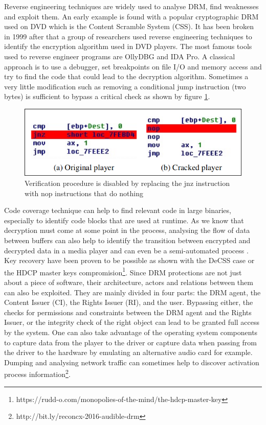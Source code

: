 \documentclass[11pt, twocolumn]{article}
\begin{document}
Reverse engineering techniques are widely used to analyse DRM, find weaknesses and exploit them.
An early example is found with a popular cryptographic DRM used on DVD which is the Content Scramble System (CSS).
It has been broken in 1999 after that a group of researchers used reverse engineering techniques to identify the encryption algorithm used in DVD players.
The most famous tools used to reverse engineer programs are OllyDBG and IDA Pro.
A classical approach is to use a debugger, set breakpoints on file I/O and memory access and try to find the code that could lead to the decryption algorithm.
Sometimes a very little modification \cite{Choi:2016} such as removing a conditional jump instruction (two bytes) is sufficient to bypass a critical check as shown by figure \ref{fig:bypass}.
\begin{figure}[ht]
	\centering
	\includegraphics[scale=0.4]{images/asmBypass.png}
	\caption{Verification procedure is disabled by replacing the jnz instruction with nop instructions that do nothing \cite{Choi:2016}}
	\label{fig:bypass}
\end{figure}
Code coverage technique can help to find relevant code in large binaries, especially to identify code blocks that are used at runtime.
As we know that decryption must come at some point in the process, analysing the flow of data between buffers can also help to identify the transition between encrypted and decrypted data in a media player and can even be a semi-automated process \cite{Wang:2013}.
Key recovery have been proven to be possible as shown with the DeCSS case or the HDCP master keys compromision\footnote{https://rudd-o.com/monopolies-of-the-mind/the-hdcp-master-key}.
Since DRM protections are not just about a piece of software, their architecture, actors and relations between them can also be exploited.
They are mainly divided in four parts: the DRM agent, the Content Issuer (CI), the Rights Issuer (RI), and the user.
Bypassing either, the checks for permissions and constraints between the DRM agent and the Rights Issuer, or the integrity check of the right object can lead to be granted full access by the system.
One can also take advantage of the operating system components to capture data from the player to the driver or capture data when passing from the driver to the hardware by emulating an alternative audio card for example.
Dumping and analysing network traffic can sometimes help to discover activation process information\footnote{http://bit.ly/reconcx-2016-audible-drm}.
\end{document}
